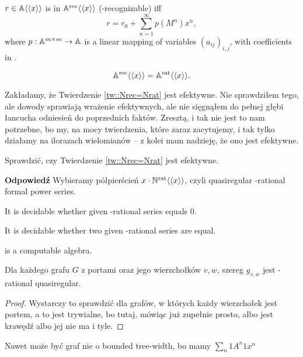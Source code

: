 \begin{df}
	$r \in  \mathbb{ A } \langle\langle x \rangle\rangle $ is in $ \mathbb{ A }^{\text{rec}} \langle\langle x \rangle\rangle $ (\bbA-recognizable) iff
	$$
		r = r_0 + \sum_{n=1}^{\infty} p(M^n) x^n,
	$$
	 where $p:\mathbb{A} ^{m \times m} \rightarrow \mathbb{A}$ is a linear mapping of variables $(a_{ij})_{i,j}$, with coefficients in \A.
\end{df}
\begin{tw}\label{tw::Nrec=Nrat}
	  $$
	  	 \mathbb{ A }^{\text{rec}} \langle\langle x \rangle\rangle  =  \mathbb{ A }^{\text{rat}} \langle\langle x \rangle\rangle .
	  $$
\end{tw}
\begin{uw}
		Zakładamy, że Twierdzenie \ref{tw::Nrec=Nrat} jest efektywne. Nie sprawdziłem tego, ale dowody sprawiają wrażenie efektywnych, ale nie sięgnąłem do pełnej głębi łancucha odniesień do poprzednich faktów. Zresztą, i tak nie jest to nam potrzebne, bo my, na mocy twierdzenia, które zaraz zacytujemy, i tak tylko działamy na ilorazach wielomianów -- z kolei mam nadzieję, że ono jest efektywne.
\end{uw}
\begin{dozr}
	Sprawdzić, czy Twierdzenie \ref{tw::Nrec=Nrat} jest efektywne.
\end{dozr}
\textbf{Odpowiedź} Wybieramy półpierścień $x\cdot  \mathbb{ N }^{\text{rat}} \langle\langle x \rangle\rangle $, czyli quasiregular \bbN-rational formal power series.
\begin{tw}
	It is decidable whether given \Z-rational series equals 0.
\end{tw}
\begin{wn}
	It is decidable whether two given \N-rational series are equal.
\end{wn}
\begin{wn}
	\Nratqralg is a computable algebra.
\end{wn}




\begin{lm}
Dla każdego grafu $G$ z portami oraz jego wierzchołków $v, w$, szereg $g_{v, w}$ jest \N-rational quasiregular.
	\end{lm}
\begin{proof}
Wystarczy to sprawdzić dla grafów, w których każdy wierzchołek jest portem, a to jest trywialne, bo tutaj, mówiąc już zupełnie prosto, albo jest krawędź albo jej nie ma i tyle.
\end{proof}
\begin{uw}
	Nawet może być graf nie o bounded tree-width, bo mamy $\sum_n 1A^n1 x^n$
\end{uw}
